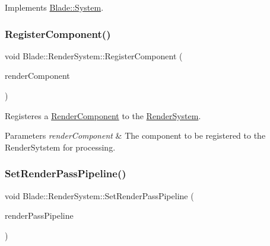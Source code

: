 Implements \hyperlink{class_blade_1_1_system_a80c186f5f9f8fa4fd317b861853fe6a8}{Blade\+::\+System}.

\mbox{\label{class_blade_1_1_render_system_a36ad263f137b6634542966dea0229047}} 
\subsubsection{\texorpdfstring{Register\+Component()}{RegisterComponent()}}
{\footnotesize\ttfamily void Blade\+::\+Render\+System\+::\+Register\+Component (\begin{DoxyParamCaption}\item[{\hyperlink{class_blade_1_1_render_component}{Render\+Component} $\ast$}]{render\+Component }\end{DoxyParamCaption})\hspace{0.3cm}{\ttfamily [noexcept]}}



Registeres a \hyperlink{class_blade_1_1_render_component}{Render\+Component} to the \hyperlink{class_blade_1_1_render_system}{Render\+System}. 


\begin{DoxyParams}{Parameters}
{\em render\+Component} & The component to be registered to the Render\+Sytstem for processing. \\
\hline
\end{DoxyParams}
\mbox{\label{class_blade_1_1_render_system_a3d760ee1b6c5b4e6f9ec0892d948b91c}} 
\subsubsection{\texorpdfstring{Set\+Render\+Pass\+Pipeline()}{SetRenderPassPipeline()}}
{\footnotesize\ttfamily void Blade\+::\+Render\+System\+::\+Set\+Render\+Pass\+Pipeline (\begin{DoxyParamCaption}\item[{Render\+Pass\+Pipeline $\ast$}]{render\+Pass\+Pipeline }\end{DoxyParamCaption})\hspace{0.3cm}{\ttfamily [noexcept]}}



